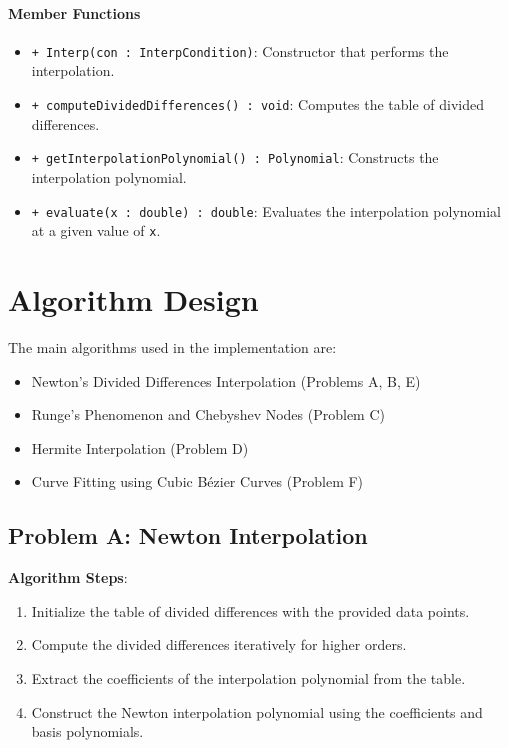 \documentclass{article}
\begin{document}
\paragraph{Member Functions}

\begin{itemize}
    \item \texttt{+ Interp(con : InterpCondition)}: Constructor that performs the interpolation.
    \item \texttt{+ computeDividedDifferences() : void}: Computes the table of divided differences.
    \item \texttt{+ getInterpolationPolynomial() : Polynomial}: Constructs the interpolation polynomial.
    \item \texttt{+ evaluate(x : double) : double}: Evaluates the interpolation polynomial at a given value of \texttt{x}.
\end{itemize}

\section{Algorithm Design}

The main algorithms used in the implementation are:

\begin{itemize}
    \item Newton's Divided Differences Interpolation (Problems A, B, E)
    \item Runge's Phenomenon and Chebyshev Nodes (Problem C)
    \item Hermite Interpolation (Problem D)
    \item Curve Fitting using Cubic Bézier Curves (Problem F)
\end{itemize}

\subsection{Problem A: Newton Interpolation}

\textbf{Algorithm Steps}:

\begin{enumerate}
    \item Initialize the table of divided differences with the provided data points.
    \item Compute the divided differences iteratively for higher orders.
    \item Extract the coefficients of the interpolation polynomial from the table.
    \item Construct the Newton interpolation polynomial using the coefficients and basis polynomials.
\end{enumerate}
\end{document}
